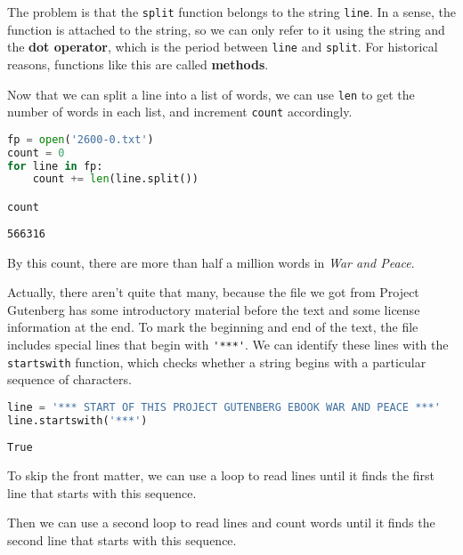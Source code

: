 The problem is that the \passthrough{\lstinline!split!} function belongs
to the string \passthrough{\lstinline!line!}. In a sense, the function
is attached to the string, so we can only refer to it using the string
and the \textbf{dot operator}, which is the period between
\passthrough{\lstinline!line!} and \passthrough{\lstinline!split!}. For
historical reasons, functions like this are called \textbf{methods}.

Now that we can split a line into a list of words, we can use
\passthrough{\lstinline!len!} to get the number of words in each list,
and increment \passthrough{\lstinline!count!} accordingly.

\begin{lstlisting}[language=Python,style=source]
fp = open('2600-0.txt')
count = 0
for line in fp:
    count += len(line.split())

count
\end{lstlisting}

\begin{lstlisting}[style=output]
566316
\end{lstlisting}

By this count, there are more than half a million words in \emph{War and
Peace}.

Actually, there aren't quite that many, because the file we got from
Project Gutenberg has some introductory material before the text and
some license information at the end. To mark the beginning and end of
the text, the file includes special lines that begin with
\passthrough{\lstinline!'***'!}. We can identify these lines with the
\passthrough{\lstinline!startswith!} function, which checks whether a
string begins with a particular sequence of characters.

\begin{lstlisting}[language=Python,style=source]
line = '*** START OF THIS PROJECT GUTENBERG EBOOK WAR AND PEACE ***'
line.startswith('***')
\end{lstlisting}

\begin{lstlisting}[style=output]
True
\end{lstlisting}

To skip the front matter, we can use a loop to read lines until it finds
the first line that starts with this sequence.

\pagebreak

Then we can use a second loop to read lines and count words until it
finds the second line that starts with this sequence.

